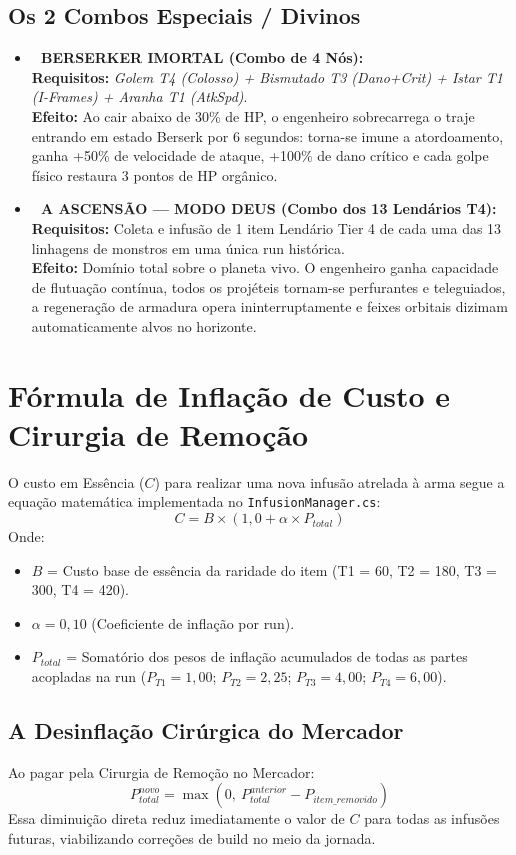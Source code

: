 \documentclass[a4paper,12pt]{report}
\begin{document}
\subsection{Os 2 Combos Especiais / Divinos}
\begin{itemize}
    \item \textbf{🌟 BERSERKER IMORTAL (Combo de 4 Nós):} \\
    \textbf{Requisitos:} \textit{Golem T4 (Colosso) + Bismutado T3 (Dano+Crit) + Istar T1 (I-Frames) + Aranha T1 (AtkSpd)}. \\
    \textbf{Efeito:} Ao cair abaixo de 30\% de HP, o engenheiro sobrecarrega o traje entrando em estado Berserk por 6 segundos: torna-se imune a atordoamento, ganha +50\% de velocidade de ataque, +100\% de dano crítico e cada golpe físico restaura 3 pontos de HP orgânico.
    \item \textbf{👑 A ASCENSÃO --- MODO DEUS (Combo dos 13 Lendários T4):} \\
    \textbf{Requisitos:} Coleta e infusão de 1 item Lendário Tier 4 de cada uma das 13 linhagens de monstros em uma única run histórica. \\
    \textbf{Efeito:} Domínio total sobre o planeta vivo. O engenheiro ganha capacidade de flutuação contínua, todos os projéteis tornam-se perfurantes e teleguiados, a regeneração de armadura opera ininterruptamente e feixes orbitais dizimam automaticamente alvos no horizonte.
\end{itemize}

\section{Fórmula de Inflação de Custo e Cirurgia de Remoção}
O custo em Essência ($C$) para realizar uma nova infusão atrelada à arma segue a equação matemática implementada no \texttt{InfusionManager.cs}:
\[
C = B \times (1{,}0 + \alpha \times P_{total})
\]
Onde:
\begin{itemize}
    \item $B$ = Custo base de essência da raridade do item (T1 = 60, T2 = 180, T3 = 300, T4 = 420).
    \item $\alpha = 0{,}10$ (Coeficiente de inflação por run).
    \item $P_{total}$ = Somatório dos pesos de inflação acumulados de todas as partes acopladas na run ($P_{T1} = 1{,}00$; $P_{T2} = 2{,}25$; $P_{T3} = 4{,}00$; $P_{T4} = 6{,}00$).
\end{itemize}

\subsection{A Desinflação Cirúrgica do Mercador}
Ao pagar pela Cirurgia de Remoção no Mercador:
\[
P_{total}^{novo} = \max(0,\ P_{total}^{anterior} - P_{item\_removido})
\]
Essa diminuição direta reduz imediatamente o valor de $C$ para todas as infusões futuras, viabilizando correções de build no meio da jornada.
\end{document}

